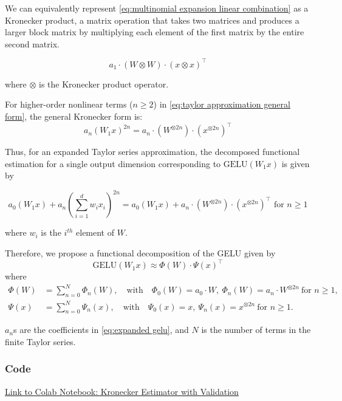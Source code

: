 \documentclass{article}
\begin{document}
We can equivalently represent \eqref{eq:multinomial expansion linear combination} as a Kronecker product, a matrix operation that takes two matrices and produces a larger block matrix by multiplying each element of the first matrix by the entire second matrix.

\begin{equation*}
    a_1 \cdot (W \otimes W) \cdot (x \otimes x)^\intercal
\end{equation*}

where $\otimes$ is the Kronecker product operator.

For higher-order nonlinear terms ($n\geq2$) in \eqref{eq:taylor approximation general form}, the general Kronecker form is:
\[
a_n (W_1 x)^{2n} = a_n \cdot (W^{\otimes 2n}) \cdot (x^{\otimes 2n})^\intercal
\]

Thus, for an expanded Taylor series approximation, the decomposed functional estimation for a single output dimension corresponding to \( \text{GELU}(W_1 x) \) is given by

\[
a_0 (W_1 x) + 
a_n \left( \sum_{i=1}^d w_i x_i \right)^{2n} = a_0 (W_1 x) + a_n \cdot \left( W^{\otimes 2n} \right) \cdot \left( x^{\otimes 2n} \right)^\intercal \text{ for } n\geq 1
\]

where $w_i$ is the $i^{th}$ element of $W$.

Therefore, we propose a functional decomposition of the GELU given by
\begin{equation}
\text{GELU}(W_1 x) \approx \Phi(W) \cdot \Psi(x)^\intercal
\label{eq:kronecker_approx}
\end{equation}
where
\begin{align*}
\Phi(W) &= \sum_{n=0}^N \Phi_n(W), \quad \text{with} \quad \Phi_0(W) = a_0 \cdot W,\ \Phi_n(W) = a_n \cdot W^{\otimes 2n}\ \text{for } n \geq 1, \\
\Psi(x) &= \sum_{n=0}^N \Psi_n(x), \quad \text{with} \quad \Psi_0(x) = x,\ \Psi_n(x) = x^{\otimes 2n}\ \text{for } n \geq 1.
\end{align*}


$a_n$s are the coefficients in \eqref{eq:expanded gelu},
and $N$ is the number of terms in the finite Taylor series.
\subsubsection{Code}

\href{https://colab.research.google.com/github/v-y-l/Machine-Learning-Notebooks/blob/main/Victor's_biased_estimation_using_kronecker_products.ipynb}{
Link to Colab Notebook: Kronecker Estimator with Validation}
\end{document}
